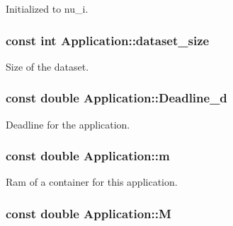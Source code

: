 Initialized to nu\-\_\-i. 

\hypertarget{classApplication_a83bcec93383a2816d9bbaa51b7dfa0c6}{
\subsubsection[{dataset\-\_\-size}]{\setlength{\rightskip}{0pt plus 5cm}const int Application\-::dataset\-\_\-size\hspace{0.3cm}{\ttfamily [private]}}}\label{classApplication_a83bcec93383a2816d9bbaa51b7dfa0c6}


Size of the dataset. 

\hypertarget{classApplication_ae90c165056428718e7341999781a3963}{
\subsubsection[{Deadline\-\_\-d}]{\setlength{\rightskip}{0pt plus 5cm}const double Application\-::\-Deadline\-\_\-d\hspace{0.3cm}{\ttfamily [private]}}}\label{classApplication_ae90c165056428718e7341999781a3963}


Deadline for the application. 

\hypertarget{classApplication_ad95ca8809237917d16779d7ed0013c8e}{
\subsubsection[{m}]{\setlength{\rightskip}{0pt plus 5cm}const double Application\-::m\hspace{0.3cm}{\ttfamily [private]}}}\label{classApplication_ad95ca8809237917d16779d7ed0013c8e}


Ram of a container for this application. 

\hypertarget{classApplication_a98cc47f6aa4ac3c70133d2922952ef7a}{
\subsubsection[{M}]{\setlength{\rightskip}{0pt plus 5cm}const double Application\-::\-M\hspace{0.3cm}{\ttfamily [private]}}}\label{classApplication_a98cc47f6aa4ac3c70133d2922952ef7a}


